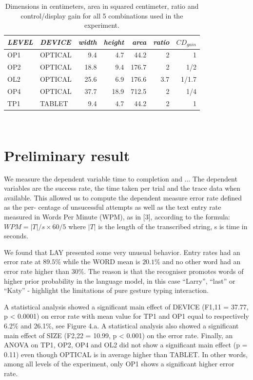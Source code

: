 \documentclass{chi-ext}
\newcommand{\smit}[1]{{\small\textit{{#1}}}}
\newcommand{\cdt}[1]{{\small\uppercase{{#1}}}}
\begin{document}
\begin{table}
  \centering
  \begin{tabular}{l l | r r r r r}
    \smit{LEVEL} & \smit{DEVICE} & \smit{width} & \smit{height} & \smit{area}& \smit{ratio} & \smit{$CD_{gain}$} \\
    \hline
    \cdt{OP1} & \cdt{optical} & 9.4 & 4.7 & 44.2 & 2 & 1 \\
    \cdt{OP2} & \cdt{optical} & 18.8 & 9.4 & 176.7 & 2 & 1/2 \\
    \cdt{OL2} & \cdt{optical} & 25.6 & 6.9 & 176.6 & 3.7 & 1/1.7 \\
    \cdt{OP4} & \cdt{optical} & 37.7 & 18.9 & 712.5 & 2 & 1/4 \\
    \hline
    \cdt{tp1} & \cdt{tablet} & 9.4 & 4.7 & 44.2 & 2 & 1 \\
  \end{tabular}
  \caption{Dimensions in centimeters, area in squared centimeter, ratio and control/display gain for all 5 combinations used in the experiment.}~\label{tab:cdt}
\end{table}

\section{Preliminary result}
We measure the dependent variable time to completion and ...
The dependent variables are the success rate, the time taken per trial and the trace data when available. This allowed us to compute the dependent measure error rate defined as the per- centage of unsucessful attempts as well as the text entry rate measured in Words Per Minute (WPM), as in [3], according to the formula: $WPM = |T|/s \times 60/5$ where $|T|$ is the length of the transcribed string, s is time in seconds.

We found that LAY presented some very unusual behavior. Entry rates had an error rate at $89.5\%$ while the WORD mean is $20.1\%$ and no other word had an error rate higher than $30\%$. The reason is that the recogniser promotes words of higher prior probability in the language model, in this case “Larry”, “last” or “Katy” - highlight the limitations of pure gesture typing interaction.

A statistical analysis showed a significant main effect of DEVICE (F1,11 = 37.77, p < 0.0001) on error rate with mean value for TP1 and OP1 equal to respectively 6.2\% and 26.1\%, see Figure 4.a. A statistical analysis also showed a significant main effect of SIZE (F2,22 = 10.99, p < 0.001) on the error rate. Finally, an ANOVA on TP1, OP2, OP4 and OL2 did not show a significant main effect (p = 0.11) even though OPTICAL is in average higher than TABLET. In other words, among all levels of the experiment, only OP1 shows a significant higher error rate.
\end{document}
